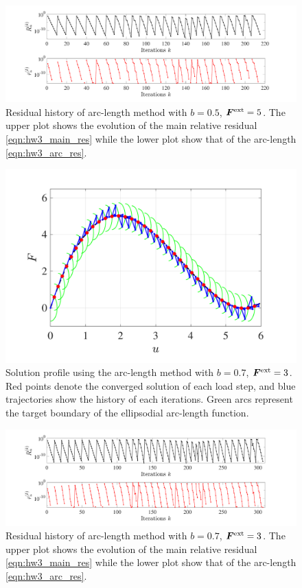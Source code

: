 \begin{figure}[!ht]
    \centering
    \includegraphics[width=\linewidth]{homework/hw3/hw3_b0pt5_res.pdf}
    \caption{Residual history of arc-length method with $b = 0.5$, $\bm{F}^{\textrm{ext}} = 5$. 
    The upper plot shows the evolution of the main relative residual \cref{eqn:hw3_main_res} while the lower plot show that of the arc-length \cref{eqn:hw3_arc_res}.}
    \label{fig:hw3_b0pt5_res}
\end{figure}

\begin{figure}[!ht]
    \centering
    \includegraphics[width=0.7\linewidth]{homework/hw3/hw3_b0pt7_soln.pdf}
    \caption{Solution profile using the arc-length method with $b = 0.7$, $\bm{F}^{\textrm{ext}} = 3$. 
    Red points denote the converged solution of each load step, and blue trajectories show the history of each iterations. 
    Green arcs represent the target boundary of the ellipsodial arc-length function.}
    \label{fig:hw3_b0pt7_soln}
\end{figure}

\begin{figure}[!ht]
    \centering
    \includegraphics[width=\linewidth]{homework/hw3/hw3_b0pt7_res.pdf}
    \caption{Residual history of arc-length method with $b = 0.7$, $\bm{F}^{\textrm{ext}} = 3$. 
    The upper plot shows the evolution of the main relative residual \cref{eqn:hw3_main_res} while the lower plot show that of the arc-length \cref{eqn:hw3_arc_res}.}
    \label{fig:hw3_b0pt7_res}
\end{figure}

